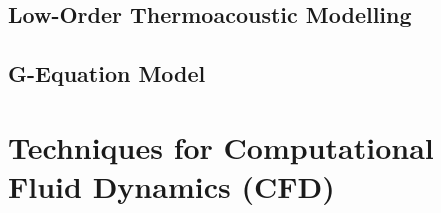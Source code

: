 \cite{emmert2015IntrinsicThermoacousticInstability}
\cite{silva2023IntrinsicThermoacousticInstabilities}
\cite{hoeijmakers2014IntrinsicInstabilityFlame}
\cite{hoeijmakers2016FlameDominatedThermoacoustic}
\cite{orchini2025TrackingAcousticIntrinsic}
\cite{chen2024BiglobalLinearStability}




\subsection{Low-Order Thermoacoustic Modelling}


\cite{juniper2018SensitivityNonlinearityThermoacoustic}



\subsection{G-Equation Model}





\section{Techniques for Computational Fluid Dynamics (CFD)}


\cite{orszag1970AnalyticalTheoriesTurbulence, domingo2023RecentDevelopmentsDNS, chen2011PetascaleDirectNumerical, yang2015LargeEddySimulationPresent, veynante2002TurbulentCombustionModeling, moin1998DirectNumericalSimulation, tennekes1972FirstCourseTurbulence}


